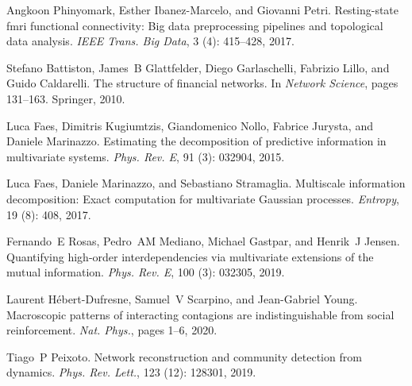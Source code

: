 Angkoon Phinyomark, Esther {Ibanez-Marcelo}, and Giovanni Petri.
\newblock Resting-state fmri functional connectivity: {{Big}} data
preprocessing pipelines and topological data analysis.
\newblock \emph{IEEE Trans. Big Data}, 3 (4): 415--428, 2017.

Stefano Battiston, James~B Glattfelder, Diego Garlaschelli, Fabrizio Lillo, and
Guido Caldarelli.
\newblock The structure of financial networks.
\newblock In \emph{Network Science}, pages 131--163. {Springer}, 2010.

Luca Faes, Dimitris Kugiumtzis, Giandomenico Nollo, Fabrice Jurysta, and
Daniele Marinazzo.
\newblock Estimating the decomposition of predictive information in
multivariate systems.
\newblock \emph{Phys. Rev. E}, 91 (3): 032904, 2015.

Luca Faes, Daniele Marinazzo, and Sebastiano Stramaglia.
\newblock Multiscale information decomposition: {{Exact}} computation for
multivariate {{Gaussian}} processes.
\newblock \emph{Entropy}, 19 (8): 408, 2017.

Fernando~E Rosas, Pedro~AM Mediano, Michael Gastpar, and Henrik~J Jensen.
\newblock Quantifying high-order interdependencies via multivariate extensions
of the mutual information.
\newblock \emph{Phys. Rev. E}, 100 (3): 032305, 2019.

Laurent {H{\'e}bert-Dufresne}, Samuel~V Scarpino, and Jean-Gabriel Young.
\newblock Macroscopic patterns of interacting contagions are indistinguishable
from social reinforcement.
\newblock \emph{Nat. Phys.}, pages 1--6, 2020.

Tiago~P Peixoto.
\newblock Network reconstruction and community detection from dynamics.
\newblock \emph{Phys. Rev. Lett.}, 123 (12): 128301, 2019.
